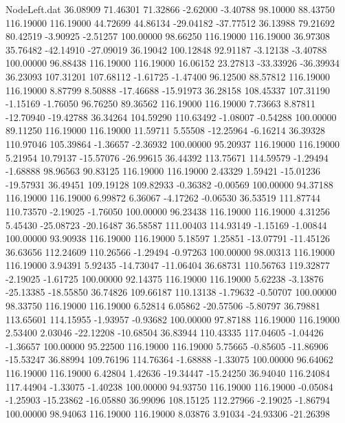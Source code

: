 \begin{filecontents}{NodeLeft.dat}
  36.08909   71.46301   71.32866    -2.62000   -3.40788   98.10000   88.43750  116.19000  116.19000   44.72699   44.86134  -29.04182  -37.77512
  36.13988   79.21692   80.42519    -3.90925   -2.51257  100.00000   98.66250  116.19000  116.19000   36.97308   35.76482  -42.14910  -27.09019
  36.19042  100.12848   92.91187    -3.12138   -3.40788  100.00000   96.88438  116.19000  116.19000   16.06152   23.27813  -33.33926  -36.39934
  36.23093  107.31201  107.68112    -1.61725   -1.47400   96.12500   88.57812  116.19000  116.19000    8.87799    8.50888  -17.46688  -15.91973
  36.28158  108.45337  107.31190    -1.15169   -1.76050   96.76250   89.36562  116.19000  116.19000    7.73663    8.87811  -12.70940  -19.42788
  36.34264  104.59290  110.63492    -1.08007   -0.54288  100.00000   89.11250  116.19000  116.19000   11.59711    5.55508  -12.25964   -6.16214
  36.39328  110.97046  105.39864    -1.36657   -2.36932  100.00000   95.20937  116.19000  116.19000    5.21954   10.79137  -15.57076  -26.99615
  36.44392  113.75671  114.59579    -1.29494   -1.68888   98.96563   90.83125  116.19000  116.19000    2.43329    1.59421  -15.01236  -19.57931
  36.49451  109.19128  109.82933    -0.36382   -0.00569  100.00000   94.37188  116.19000  116.19000    6.99872    6.36067   -4.17262   -0.06530
  36.53519  111.87744  110.73570    -2.19025   -1.76050  100.00000   96.23438  116.19000  116.19000    4.31256    5.45430  -25.08723  -20.16487
  36.58587  111.00403  114.93149    -1.15169   -1.00844  100.00000   93.90938  116.19000  116.19000    5.18597    1.25851  -13.07791  -11.45126
  36.63656  112.24609  110.26566    -1.29494   -0.97263  100.00000   98.00313  116.19000  116.19000    3.94391    5.92435  -14.73047  -11.06404
  36.68731  110.56763  119.32877    -2.19025   -1.61725  100.00000   92.14375  116.19000  116.19000    5.62238   -3.13876  -25.13385  -18.55850
  36.74826  109.66187  110.13138    -1.79632   -0.50707  100.00000   98.33750  116.19000  116.19000    6.52814    6.05862  -20.57506   -5.80797
  36.79881  113.65601  114.15955    -1.93957   -0.93682  100.00000   97.87188  116.19000  116.19000    2.53400    2.03046  -22.12208  -10.68504
  36.83944  110.43335  117.04605    -1.04426   -1.36657  100.00000   95.22500  116.19000  116.19000    5.75665   -0.85605  -11.86906  -15.53247
  36.88994  109.76196  114.76364    -1.68888   -1.33075  100.00000   96.64062  116.19000  116.19000    6.42804    1.42636  -19.34447  -15.24250
  36.94040  116.24084  117.44904    -1.33075   -1.40238  100.00000   94.93750  116.19000  116.19000   -0.05084   -1.25903  -15.23862  -16.05880
  36.99096  108.15125  112.27966    -2.19025   -1.86794  100.00000   98.94063  116.19000  116.19000    8.03876    3.91034  -24.93306  -21.26398

\end{filecontents}
